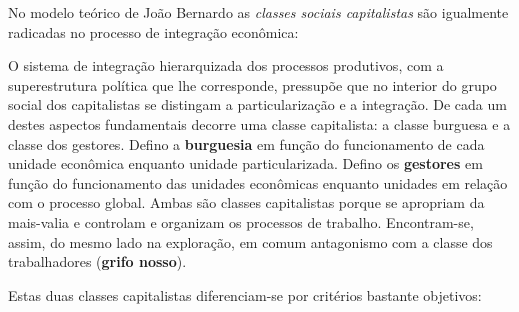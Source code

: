 No modelo teórico de João Bernardo as \textit{classes sociais capitalistas} são igualmente radicadas no processo de integração econômica:

\begin{citacao}
O sistema de integração hierarquizada dos processos produtivos, com a superestrutura política que lhe corresponde, pressupõe que no interior do grupo social dos capitalistas se distingam a particularização e a integração. De cada um destes aspectos fundamentais decorre uma classe capitalista: a classe burguesa e a classe dos gestores. Defino a \textbf{burguesia} em função do funcionamento de cada unidade econômica enquanto unidade particularizada. Defino os \textbf{gestores} em função do funcionamento das unidades econômicas enquanto unidades em relação com o processo global. Ambas são classes capitalistas porque se apropriam da mais-valia e controlam e organizam os processos de trabalho. Encontram-se, assim, do mesmo lado na exploração, em comum antagonismo com a classe dos trabalhadores \cite[p.~202]{BERNARDO1991} (\textbf{grifo nosso}). 
\end{citacao}

Estas duas classes capitalistas diferenciam-se por critérios bastante objetivos:

